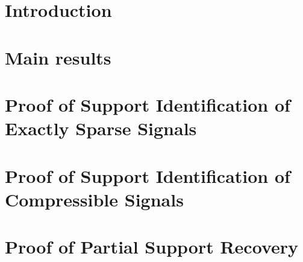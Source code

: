 \documentclass[preprint,11pt]{elsarticle}
\begin{document}
\section{Introduction}
\label{sec:intro}




\section{Main results}
\label{sec-contributions}



\section{Proof of Support Identification of Exactly Sparse Signals}
\label{sec-exact-sparsity}



\section{Proof of Support Identification of Compressible Signals}
\label{sec-compressibility}





\section{Proof of Partial Support Recovery}
\label{sec-PartialSupportRecovery}




\end{document}
